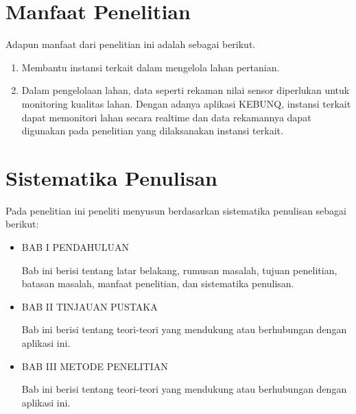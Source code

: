 \begin{flushleft}
\section{Manfaat Penelitian}

\begin{justify}
  Adapun manfaat dari penelitian ini adalah sebagai berikut.


\end{justify}
\begin{enumerate}
  \item Membantu instansi terkait dalam mengelola lahan pertanian.
  \item Dalam pengelolaan lahan, data seperti rekaman nilai sensor diperlukan untuk monitoring kualitas lahan. Dengan adanya aplikasi KEBUNQ, instansi terkait dapat memonitori lahan secara realtime dan data rekamannya dapat digunakan pada penelitian yang dilaksanakan instansi terkait.

  \end{enumerate}
\vspace{2cm}



\section{Sistematika Penulisan}
Pada penelitian ini peneliti menyusun berdasarkan sistematika penulisan sebagai berikut: \\
\begin{itemize}
  \item \noindent BAB I PENDAHULUAN
  \begin{justify}
  Bab ini berisi tentang latar belakang, rumusan masalah, tujuan penelitian, 
  batasan masalah, manfaat penelitian, dan sistematika penulisan.
  \end{justify}
\end{itemize}

\begin{itemize}
  \item \noindent BAB II TINJAUAN PUSTAKA
  \begin{justify}
    Bab ini berisi tentang teori-teori yang mendukung atau berhubungan dengan aplikasi ini.

  \end{justify}
\end{itemize}

\begin{itemize}
  \item \noindent BAB III METODE PENELITIAN
  \begin{justify}
    Bab ini berisi tentang teori-teori yang mendukung atau berhubungan dengan aplikasi ini.


\end{justify}
\end{itemize}
\end{flushleft}
